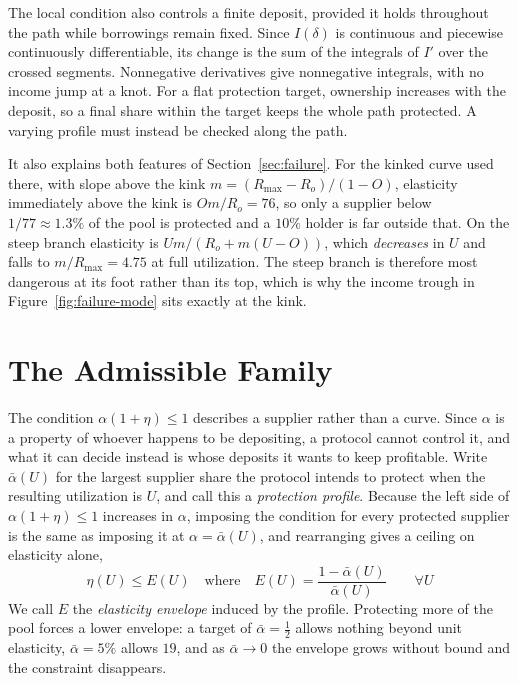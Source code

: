 \documentclass[11pt,a4paper]{article}
\begin{document}
The local condition also controls a finite deposit, provided it holds throughout the path while borrowings remain fixed. Since $I(\delta)$ is continuous and piecewise continuously differentiable, its change is the sum of the integrals of $I'$ over the crossed segments. Nonnegative derivatives give nonnegative integrals, with no income jump at a knot. For a flat protection target, ownership increases with the deposit, so a final share within the target keeps the whole path protected. A varying profile must instead be checked along the path.

It also explains both features of Section~\ref{sec:failure}. For the kinked curve used there, with slope above the kink $m=(R_{\max}-R_o)/(1-O)$, elasticity immediately above the kink is $Om/R_o=76$, so only a supplier below $1/77\approx1.3\%$ of the pool is protected and a $10\%$ holder is far outside that. On the steep branch elasticity is $Um/(R_o+m(U-O))$, which \emph{decreases} in $U$ and falls to $m/R_{\max}=4.75$ at full utilization. The steep branch is therefore most dangerous at its foot rather than its top, which is why the income trough in Figure~\ref{fig:failure-mode} sits exactly at the kink.

\section{The Admissible Family}
\label{sec:family}

The condition $\alpha(1+\eta)\leq1$ describes a supplier rather than a curve. Since $\alpha$ is a property of whoever happens to be depositing, a protocol cannot control it, and what it can decide instead is whose deposits it wants to keep profitable. Write $\bar\alpha(U)$ for the largest supplier share the protocol intends to protect when the resulting utilization is $U$, and call this a \emph{protection profile}. Because the left side of $\alpha(1+\eta)\leq1$ increases in $\alpha$, imposing the condition for every protected supplier is the same as imposing it at $\alpha=\bar\alpha(U)$, and rearranging gives a ceiling on elasticity alone,
\[
\boxed{
\eta(U)\leq E(U)
\quad\text{where}\quad
E(U)=\frac{1-\bar\alpha(U)}{\bar\alpha(U)}
\qquad\forall U
}
\]
We call $E$ the \emph{elasticity envelope} induced by the profile. Protecting more of the pool forces a lower envelope: a target of $\bar\alpha=\tfrac12$ allows nothing beyond unit elasticity, $\bar\alpha=5\%$ allows $19$, and as $\bar\alpha\to0$ the envelope grows without bound and the constraint disappears.
\end{document}
